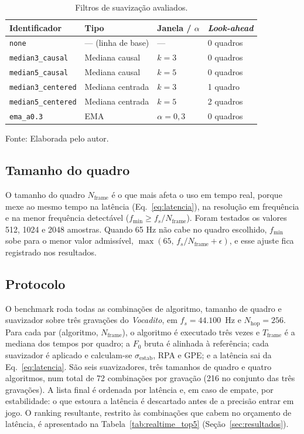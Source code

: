 \begin{table}[H]
\centering
\caption{\label{tab:smoothers}Filtros de suavização avaliados.}
\small
\begin{tabular}{|p{4.2cm}|p{4.5cm}|p{2.5cm}|p{2.8cm}|}
\hline
\textbf{Identificador} & \textbf{Tipo} & \textbf{Janela / $\alpha$} & \textbf{\textit{Look-ahead}} \\
\hline
\texttt{none} & --- (linha de base) & --- & 0 quadros \\
\hline
\texttt{median3\_causal} & Mediana causal & $k = 3$ & 0 quadros \\
\hline
\texttt{median5\_causal} & Mediana causal & $k = 5$ & 0 quadros \\
\hline
\texttt{median3\_centered} & Mediana centrada & $k = 3$ & 1 quadro \\
\hline
\texttt{median5\_centered} & Mediana centrada & $k = 5$ & 2 quadros \\
\hline
\texttt{ema\_a0.3} & EMA & $\alpha = 0{,}3$ & 0 quadros \\
\hline
\end{tabular}
\small Fonte: Elaborada pelo autor.
\end{table}

\subsection{Tamanho do quadro}
O tamanho do quadro $N_{\text{frame}}$ é o que mais afeta o uso em tempo real, porque mexe ao mesmo tempo na latência (Eq.~\ref{eq:latencia}), na resolução em frequência e na menor frequência detectável ($f_{\text{min}} \geq f_s / N_{\text{frame}}$). Foram testados os valores 512, 1024 e 2048 amostras. Quando 65 Hz não cabe no quadro escolhido, $f_{\text{min}}$ sobe para o menor valor admissível, $\max(65,\, f_s/N_{\text{frame}} + \epsilon)$, e esse ajuste fica registrado nos resultados.

\subsection{Protocolo}
O benchmark roda todas as combinações de algoritmo, tamanho de quadro e suavizador sobre três gravações do \textit{Vocadito}, em $f_s = 44{.}100$~Hz e $N_{\text{hop}} = 256$. Para cada par (algoritmo, $N_{\text{frame}}$), o algoritmo é executado três vezes e $T_{\text{frame}}$ é a mediana dos tempos por quadro; a $F_0$ bruta é alinhada à referência; cada suavizador é aplicado e calculam-se $\sigma_{\text{estab}}$, RPA e GPE; e a latência sai da Eq.~\ref{eq:latencia}. São seis suavizadores, três tamanhos de quadro e quatro algoritmos, num total de 72 combinações por gravação (216 no conjunto das três gravações). A lista final é ordenada por latência e, em caso de empate, por estabilidade: o que estoura a latência é descartado antes de a precisão entrar em jogo. O ranking resultante, restrito às combinações que cabem no orçamento de latência, é apresentado na Tabela~\ref{tab:realtime_top5} (Seção~\ref{sec:resultados}).


